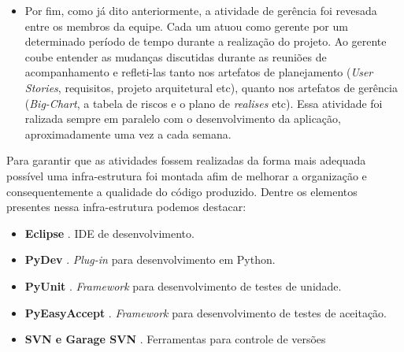 \begin{itemize}
 \item Por fim, como já dito anteriormente, a atividade de gerência foi revesada entre os membros da equipe. Cada um atuou como gerente por um determinado período de tempo durante a realização do projeto. Ao gerente coube entender as mudanças discutidas durante as reuniões de acompanhamento e refleti-las tanto nos artefatos de planejamento (\textit{User Stories}, requisitos, projeto arquitetural etc), quanto nos artefatos de gerência (\textit{Big-Chart}, a tabela de riscos  e o plano de \textit{realises} etc). Essa atividade foi ralizada sempre em paralelo com o desenvolvimento da aplicação, aproximadamente uma vez a cada semana.
\end{itemize}

Para garantir que as atividades fossem realizadas da forma mais adequada possível uma infra-estrutura foi montada afim de melhorar a organização e consequentemente a qualidade do código produzido. Dentre os elementos presentes nessa infra-estrutura podemos destacar:

\begin{itemize}
 \item \textbf{Eclipse} \cite{eclipse}. IDE de desenvolvimento.
 \item \textbf{PyDev} \cite{pydev}. \textit{Plug-in} para desenvolvimento em Python.
 \item \textbf{PyUnit} \cite{pyunit}. \textit{Framework} para desenvolvimento de testes de unidade.
 \item \textbf{PyEasyAccept} \cite{pyeasyaccept}. \textit{Framework} para desenvolvimento de testes de aceitação.
 \item \textbf{SVN e Garage SVN} \cite{SVN}\cite{garage}. Ferramentas para controle de versões
\end{itemize}




